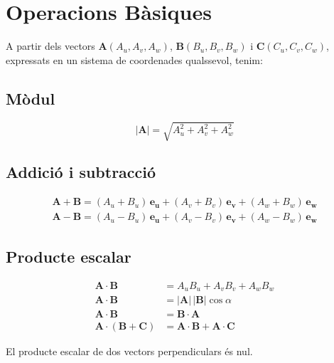 \documentclass[catalan,a4paper,twoside,11pt]{article}
\begin{document}
\section{Operacions  Bàsiques}
\newcommand{\va}{\ensuremath{\,\boldsymbol{e_u}}}
\newcommand{\vb}{\ensuremath{\,\boldsymbol{e_v}}}
\newcommand{\vc}{\ensuremath{\,\boldsymbol{e_w}}}

A partir dels vectors $\boldsymbol{A}(A_u,A_v,A_w)$,  $\boldsymbol{B}(B_u,B_v,B_w)$ i $\boldsymbol{C}(C_u,C_v,C_w)$, expressats en un sistema de coordenades qualssevol, tenim:

\subsection{Mòdul}
\vspace{-5mm}
\begin{equation}
    |\boldsymbol{A}|=  \sqrt{A_u^2 + A_v^2 + A_w^2}
\end{equation}

\subsection{Addició i subtracció}
\vspace{-5mm}
\begin{subequations}\begin{align}
    \boldsymbol{A+B}= (A_u+B_u)\va + (A_v+B_v)\vb + (A_w+B_w)\vc \\
    \boldsymbol{A-B}= (A_u-B_u)\va + (A_v-B_v)\vb + (A_w-B_w)\vc
\end{align}\end{subequations}

\subsection{Producte escalar}
\vspace{-5mm}
\begin{align}
    \boldsymbol{A\cdot B} &= A_u B_u + A_v B_v + A_w B_w\\
    \boldsymbol{A\cdot B} &=|\boldsymbol{A}| \, |\boldsymbol{B}| \cos\alpha\\
    \boldsymbol{A\cdot B} &=\boldsymbol{B\cdot A}\\
    \boldsymbol{A\cdot(B+C)} &= \boldsymbol{A\cdot B+ A\cdot C}
\end{align}

El producte escalar de dos vectors perpendiculars  és nul.
\end{document}
